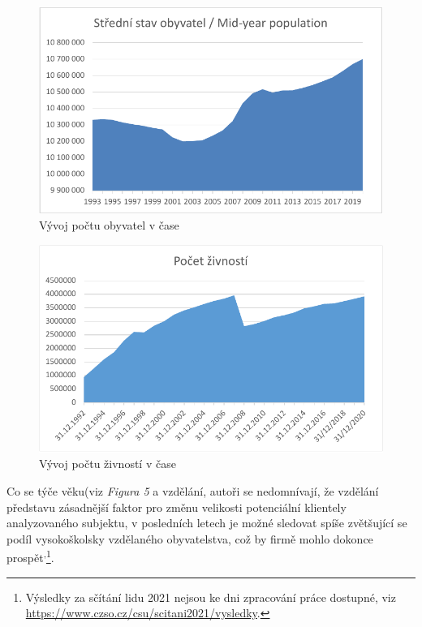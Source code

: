 \begin{figure}[!hbtp]
	\centering
	\includegraphics[width=0.8\linewidth]{Parts/InternalResources/CHART_Population_in_time.pdf}
	\caption[Vývoj počtu obyvatel v čase]{Vývoj počtu obyvatel v čase}
	\label{fig:Vyvoj poctu obyvatel v case}
\end{figure}

\newpage

\begin{figure}[!hbtp]
	\centering
	\includegraphics[width=0.8\linewidth]{Parts/InternalResources/CHART_Zivnosti_in_time.pdf}
	\caption[Vývoj počtu živností v čase]{Vývoj počtu živností v čase}
	\label{fig:Vyvoj poctu zivnosti v case}
\end{figure}

Co se týče věku(viz \textit{Figura 5} a vzdělání, autoři se nedomnívají, že vzdělání představu zásadnější faktor pro změnu velikosti potenciální klientely analyzovaného subjektu, v posledních letech je možné sledovat spíše zvětšující se podíl vysokoškolsky vzdělaného obyvatelstva, což by firmě mohlo dokonce prospět\textsuperscript{,}\footnote{Výsledky za sčítání lidu 2021 nejsou ke dni zpracování práce dostupné, viz \url{https://www.czso.cz/csu/scitani2021/vysledky}.}.\\

